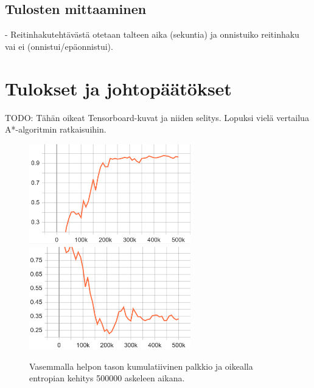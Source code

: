 \documentclass[utf8]{gradu3}
\begin{document}
\section{Tulosten mittaaminen}
\label{sec:mittaaminen}

- Reitinhakutehtävästä otetaan talteen aika (sekuntia) ja onnistuiko reitinhaku vai ei (onnistui/epäonnistui).

\chapter{Tulokset ja johtopäätökset}
\label{tulokset}

TODO: Tähän oikeat Tensorboard-kuvat ja niiden selitys. Lopuksi vielä vertailua A*-algoritmin ratkaisuihin.

\begin{figure}[h]
\includegraphics[width=7cm]{B_Cumulative_Reward.png}
\includegraphics[width=7cm]{B_Policy_Entropy.png}
\caption{Vasemmalla helpon tason kumulatiivinen palkkio ja oikealla entropian kehitys 500000 askeleen aikana.}
\label{beginnercumulativeentropy}
\end{figure}
\end{document}

